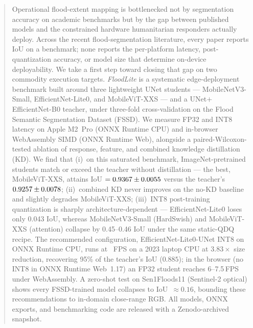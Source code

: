
\begin{abstract}
Operational flood-extent mapping is bottlenecked not by segmentation accuracy on academic benchmarks but by the gap between published models and the constrained hardware humanitarian responders actually deploy. Across the recent flood-segmentation literature, every paper reports IoU on a benchmark; none reports the per-platform latency, post-quantization accuracy, or model size that determine on-device deployability. We take a first step toward closing that gap on two commodity execution targets. \emph{FloodLite} is a systematic edge-deployment benchmark built around three lightweight UNet students --- MobileNetV3-Small, EfficientNet-Lite0, and MobileViT-XXS --- and a UNet$+$EfficientNet-B0 teacher, under three-fold cross-validation on the Flood Semantic Segmentation Dataset (FSSD). We measure FP32 and INT8 latency on Apple M2~Pro (ONNX Runtime CPU) and in-browser WebAssembly SIMD (ONNX Runtime Web), alongside a paired-Wilcoxon-tested ablation of response, feature, and combined knowledge distillation (KD). We find that (i)~on this saturated benchmark, ImageNet-pretrained students match or exceed the teacher without distillation --- the best, MobileViT-XXS, attains IoU $=\bestStudentIoU \pm \bestStudentStd$ versus the teacher's $\teacherIoU \pm \teacherStd$; (ii)~combined KD never improves on the no-KD baseline and slightly degrades MobileViT-XXS; (iii)~INT8 post-training quantization is sharply architecture-dependent --- EfficientNet-Lite0 loses only 0.043 IoU, whereas MobileNetV3-Small (HardSwish) and MobileViT-XXS (attention) collapse by 0.45--0.46 IoU under the same static-QDQ recipe. The recommended configuration, EfficientNet-Lite0-UNet INT8 on ONNX Runtime CPU, runs at \deployableMTwoFPS~FPS on a 2023 laptop CPU at $3.83\times$ size reduction, recovering 95\% of the teacher's IoU ($0.885$); in the browser (no INT8 in ONNX Runtime Web~1.17) an FP32 student reaches 6--7.5\,FPS under WebAssembly. A zero-shot test on Sen1Floods11 (Sentinel-2 optical) shows every FSSD-trained model collapses to IoU~$\approx 0.16$, bounding these recommendations to in-domain close-range RGB. All models, ONNX exports, and benchmarking code are released with a Zenodo-archived snapshot.
\end{abstract}
